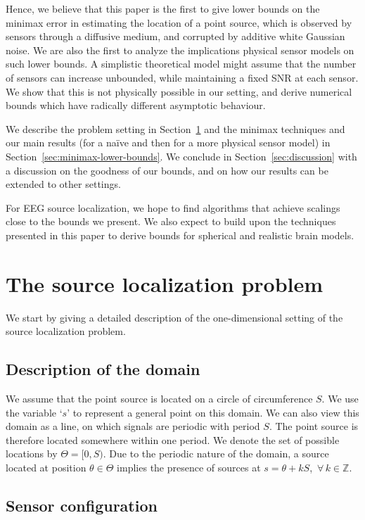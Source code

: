 \documentclass[conference]{IEEEtran}
\begin{document}
Hence, we believe that this paper is the first to give lower bounds on the
minimax error in estimating the location of a point source, which is observed
by sensors through a diffusive medium, and corrupted by additive white Gaussian
noise. We are also the first to analyze the implications physical sensor models
on such lower bounds. A simplistic theoretical model might assume that the
number of sensors can increase unbounded, while maintaining a fixed SNR at each
sensor. We show that this is not physically possible in our setting, and derive
numerical bounds which have radically different asymptotic behaviour.

We describe the problem setting in Section~\ref{sec:source-localization} and
the minimax techniques and our main results (for a na\"ive and then for a more
physical sensor model) in Section~\ref{sec:minimax-lower-bounds}. We conclude
in Section~\ref{sec:discussion} with a discussion on the goodness of our
bounds, and on how our results can be extended to other settings.

For EEG source localization, we hope to find algorithms that achieve scalings
close to the bounds we present.  We also expect to build upon the techniques
presented in this paper to derive bounds for spherical and realistic brain
models.

\section{The source localization problem}
\label{sec:source-localization}

We start by giving a detailed description of the one-dimensional setting of the
source localization problem.

\subsection{Description of the domain}

We assume that the point source is located on a circle of circumference $S$. We
use the variable `$s$' to represent a general point on this domain. We can also
view this domain as a line, on which signals are periodic with period $S$.  The
point source is therefore located somewhere within one period. We denote the
set of possible locations by $\Theta = [0, S)$. Due to the periodic nature of
the domain, a source located at position $\theta \in \Theta$ implies the
presence of sources at $s = \theta + kS$,~$\forall \, k \in \mathbb Z$.

\subsection{Sensor configuration}
\end{document}
